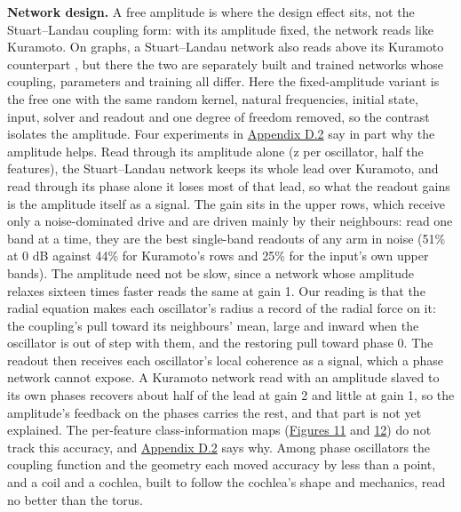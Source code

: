 \documentclass{article}
\begin{document}
\textbf{Network design.} A free amplitude is where the design effect
sits, not the Stuart--Landau coupling form: with its amplitude fixed,
the network reads like Kuramoto. On graphs, a Stuart--Landau network
also reads above its Kuramoto counterpart \citep{zhang2026}, but there
the two are separately built and trained networks whose coupling,
parameters and training all differ. Here the fixed-amplitude variant is
the free one with the same random kernel, natural frequencies, initial
state, input, solver and readout and one degree of freedom removed, so
the contrast isolates the amplitude. Four experiments in
\hyperref[sec-D-2]{Appendix D.2} say in part why the amplitude helps.
Read through its amplitude alone (\textbar z\textbar{} per oscillator,
half the features), the Stuart--Landau network keeps its whole lead over
Kuramoto, and read through its phase alone it loses most of that lead,
so what the readout gains is the amplitude itself as a signal. The gain
sits in the upper rows, which receive only a noise-dominated drive and
are driven mainly by their neighbours: read one band at a time, they are
the best single-band readouts of any arm in noise (51\% at 0 dB against
44\% for Kuramoto's rows and 25\% for the input's own upper bands). The
amplitude need not be slow, since a network whose amplitude relaxes
sixteen times faster reads the same at gain 1. Our reading is that the
radial equation makes each oscillator's radius a record of the radial
force on it: the coupling's pull toward its neighbours' mean, large and
inward when the oscillator is out of step with them, and the restoring
pull toward phase 0. The readout then receives each oscillator's local
coherence as a signal, which a phase network cannot expose. A Kuramoto
network read with an amplitude slaved to its own phases recovers about
half of the lead at gain 2 and little at gain 1, so the amplitude's
feedback on the phases carries the rest, and that part is not yet
explained. The per-feature class-information maps
(\hyperref[fig-fig11-appD2-class-information]{Figures 11} and
\hyperref[fig-fig12-appD2-class-information-seeds]{12}) do not track
this accuracy, and \hyperref[sec-D-2]{Appendix D.2} says why. Among
phase oscillators the coupling function and the geometry each moved
accuracy by less than a point, and a coil and a cochlea, built to follow
the cochlea's shape and mechanics, read no better than the torus.
\end{document}
